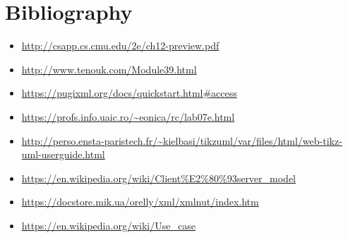 \documentclass{llncs}
\begin{document}
\section*{Bibliography}

	\begin{itemize}  
		\item \url{http://csapp.cs.cmu.edu/2e/ch12-preview.pdf}
		\item \url{http://www.tenouk.com/Module39.html}
		\item \url{https://pugixml.org/docs/quickstart.html#access}
		\item \url{https://profs.info.uaic.ro/~eonica/rc/lab07e.html}
		\item\url{ http://perso.ensta-paristech.fr/~kielbasi/tikzuml/var/files/html/web-tikz-uml-userguide.html}
		\item\url{ https://en.wikipedia.org/wiki/Client%E2%80%93server_model}
		\item \url{https://docstore.mik.ua/orelly/xml/xmlnut/index.htm}
		\item \url{https://en.wikipedia.org/wiki/Use_case}
	\end{itemize}
\end{document}
